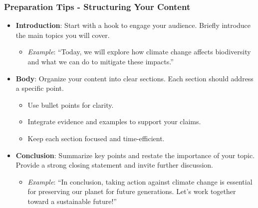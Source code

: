 \documentclass[aspectratio=169]{beamer}
\begin{document}
\begin{frame}[fragile]
    \frametitle{Preparation Tips - Structuring Your Content}
    \begin{itemize}
        \item \textbf{Introduction}: Start with a hook to engage your audience. Briefly introduce the main topics you will cover.
        \begin{itemize}
            \item \textit{Example}: “Today, we will explore how climate change affects biodiversity and what we can do to mitigate these impacts.”
        \end{itemize}
        
        \item \textbf{Body}: Organize your content into clear sections. Each section should address a specific point.
        \begin{itemize}
            \item Use bullet points for clarity.
            \item Integrate evidence and examples to support your claims.
            \item Keep each section focused and time-efficient.
        \end{itemize}
        
        \item \textbf{Conclusion}: Summarize key points and restate the importance of your topic. Provide a strong closing statement and invite further discussion.
        \begin{itemize}
            \item \textit{Example}: “In conclusion, taking action against climate change is essential for preserving our planet for future generations. Let’s work together toward a sustainable future!”
        \end{itemize}
    \end{itemize}
\end{frame}
\end{document}
